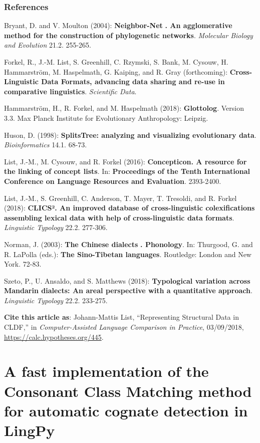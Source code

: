 \documentclass[
  english,
  a4paper,
  oneside,tablecaptionabove
]{scrbook}
\begin{document}
\hypertarget{references}{\subsection*{References}\label{references}}

Bryant, D. and V. Moulton (2004): \textbf{Neighbor-Net} \textbf{. An
agglomerative method for the construction of phylogenetic networks}.
\emph{Molecular Biology and Evolution} 21.2. 255-265.

Forkel, R., J.-M. List, S. Greenhill, C. Rzymski, S. Bank, M.
Cysouw, H. Hammarström, M. Haspelmath, G. Kaiping, and R. Gray
(forthcoming): \textbf{Cross-Linguistic Data Formats, advancing data
sharing and re-use in comparative linguistics}. \emph{Scientific Data}.

Hammarström, H., R. Forkel, and M. Haspelmath (2018):
\textbf{Glottolog}. Version 3.3. Max Planck Institute for Evolutionary
Anthropology: Leipzig.

Huson, D. (1998): \textbf{SplitsTree: analyzing and visualizing
evolutionary data}. \emph{Bioinformatics} 14.1. 68-73.

List, J.-M., M. Cysouw, and R. Forkel (2016): \textbf{Concepticon. A
resource for the linking of concept lists}. In: \textbf{Proceedings of
the Tenth International Conference on Language Resources and Evaluation}. 2393-2400.

List, J.-M., S. Greenhill, C. Anderson, T. Mayer, T. Tresoldi, and
R. Forkel (2018): \textbf{CLICS². An improved database of
cross-linguistic colexifications assembling lexical data with help of
cross-linguistic data formats}. \emph{Linguistic Typology} 22.2.
277-306.

Norman, J. (2003): \textbf{The Chinese dialects} \textbf{.
Phonology}. In: Thurgood, G. and R. LaPolla (eds.): \textbf{The
Sino-Tibetan languages}. Routledge: London and New York. 72-83.

Szeto, P., U. Ansaldo, and S. Matthews (2018): \textbf{Typological
variation across Mandarin dialects: An areal perspective with a
quantitative approach}. \emph{Linguistic Typology} 22.2. 233-275.

\textbf{Cite this article as}: Johann-Mattis List, ``Representing
Structural Data in CLDF,'' in \emph{Computer-Assisted Language Comparison
in Practice}, 03/09/2018, \url{https://calc.hypotheses.org/445}.

\hypertarget{a-fast-implementation-of-the-consonant-class-matching-method-for-automatic-cognate-detection-in-lingpy}{%
\chapter{A fast implementation of the Consonant Class Matching method
for automatic cognate detection in
LingPy}\label{a-fast-implementation-of-the-consonant-class-matching-method-for-automatic-cognate-detection-in-lingpy}}
\end{document}
